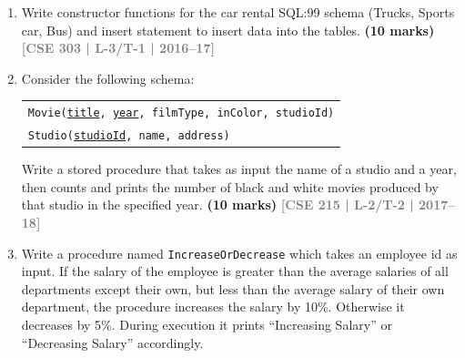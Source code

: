 \documentclass[12pt,a3paper]{article}
\newcommand{\yr}[1]{\hfill\textcolor{gray}{\small\textbf{[#1]}}}
\newcommand{\mk}[1]{\textcolor{orange!70!black}{\small\textbf{(#1 marks)}}}
\begin{document}
\begin{enumerate}

\item Write constructor functions for the car rental SQL:99 schema (Trucks, Sports car, Bus) and insert statement to insert data into the tables.
\mk{10} \yr{CSE 303 | L-3/T-1 | 2016--17}

\item Consider the following schema:
\begin{center}
\begin{tabular}{l}
\texttt{Movie(\underline{title}, \underline{year}, filmType, inColor, studioId)}\\
\texttt{Studio(\underline{studioId}, name, address)}
\end{tabular}
\end{center}
Write a stored procedure that takes as input the name of a studio and a year, then counts and prints the number of black and white movies produced by that studio in the specified year.
\mk{10} \yr{CSE 215 | L-2/T-2 | 2017--18}

\item Write a procedure named \texttt{IncreaseOrDecrease} which takes an employee id as input. If the salary of the employee is greater than the average salaries of all departments except their own, but less than the average salary of their own department, the procedure increases the salary by 10\%. Otherwise it decreases by 5\%. During execution it prints ``Increasing Salary'' or ``Decreasing Salary'' accordingly.

\begin{center}
  
    \begin{tikzpicture}[
        >=Stealth,
        line width=0.6pt,
        table_box/.style={
            draw=borderblue,
            fill=white,
            rounded corners=2pt,
            thick,
            inner sep=8pt,
            font=\sffamily\small,
            align=left
        },
        join_label/.style={
            draw=borderblue!70,
            dashed,
            fill=labelbg,
            rounded corners=3pt,
            font=\sffamily\scriptsize,
            inner sep=3pt,
            align=center
        },
        rel_line/.style={
            draw=black!70,
            dashed,
            thick
        }
    ]


\end{tikzpicture}
\end{center}
\end{enumerate}
\end{document}
